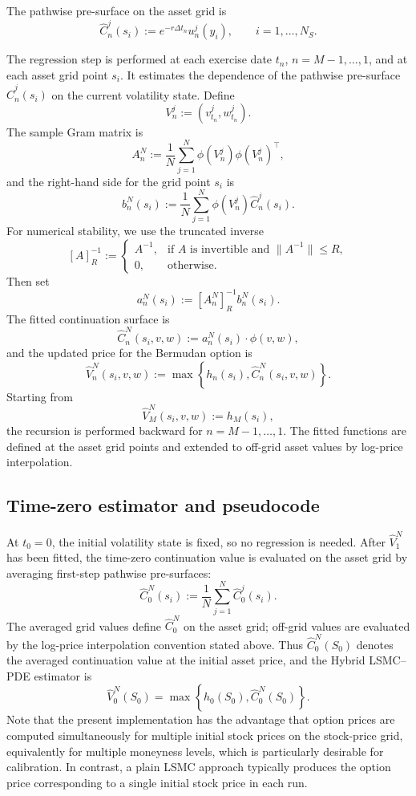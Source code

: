 \documentclass[pdflatex,sn-mathphys-num]{sn-jnl}
\theoremstyle{thmstyleone}%
\theoremstyle{thmstylethree}%
\theoremstyle{thmstyletwo}%
\begin{document}
The pathwise pre-surface on the asset grid is
$$
\widehat C_n^j(s_i)
:=
e^{-r\Delta t_n}u_n^j(y_i),
\qquad i=1,\ldots,N_S.
$$

The regression step is performed at each exercise date $t_n$,
$n=M-1,\ldots,1$, and at each asset grid point $s_i$. It estimates the
dependence of the pathwise pre-surface $\widehat C_n^j(s_i)$ on the current
volatility state. Define
$$
V_n^j:=(v_{t_n}^j,w_{t_n}^j).
$$
The sample Gram matrix is
$$
A_n^N
:=
\frac1N\sum_{j=1}^N
\phi(V_n^j)\phi(V_n^j)^\top,
$$
and the right-hand side for the grid point $s_i$ is
$$
b_n^N(s_i)
:=
\frac1N\sum_{j=1}^N
\phi(V_n^j)\widehat C_n^j(s_i).
$$
For numerical stability, we use the truncated inverse
\begin{equation}\label{eq:estimated_coeff}
[A]^{-1}_R
:=
\begin{cases}
A^{-1}, & \text{if $A$ is invertible and }\|A^{-1}\|\le R,\\
0,  & \text{otherwise.}
\end{cases}
\end{equation}
Then set
\begin{equation}
a_n^N(s_i):=[A_n^N]^{-1}_R b_n^N(s_i).
\label{eq:lsq}
\end{equation}
The fitted continuation surface is
$$
\widehat C_n^N(s_i,v,w)
:=
a_n^N(s_i)\cdot\phi(v,w),
$$
and the updated price for the Bermudan option is
$$
\widehat V_n^N(s_i,v,w)
:=
\max\left\{
h_n(s_i),
\widehat C_n^N(s_i,v,w)
\right\}.
$$
Starting from
$$
\widehat V_M^N(s_i,v,w):=h_M(s_i),
$$
the recursion is performed backward for $n=M-1,\ldots,1$. The fitted functions
are defined at the asset grid points and extended to off-grid asset values by
log-price interpolation.

\subsection{Time-zero estimator and pseudocode}
At $t_0=0$, the initial volatility state is fixed, so no regression is needed. After $\widehat V_1^N$ has been fitted, the time-zero
continuation value is evaluated on the asset grid by averaging first-step
pathwise pre-surfaces:
$$
\widehat C_0^N(s_i)
:=
\frac1N
\sum_{j=1}^{N}
\widehat C_0^j(s_i).
$$
The averaged grid values define $\widehat C_0^N$ on the asset grid; off-grid
values are evaluated by the log-price interpolation convention stated above.
Thus $\widehat C_0^N(S_0)$ denotes the averaged continuation value at the
initial asset price, and the Hybrid LSMC--PDE estimator is
\begin{equation}\label{eq:hybrid_est}
\widehat V_0^N(S_0)
=
\max\left\{
h_0(S_0),
\widehat C_0^N(S_0)
\right\}.
\end{equation}
Note that the present implementation has the advantage that option prices are computed simultaneously for multiple initial stock prices on the stock-price grid, equivalently for multiple moneyness levels, which is particularly desirable for calibration. In contrast, a plain LSMC approach typically produces the option price corresponding to a single initial stock price in each run.
\end{document}
